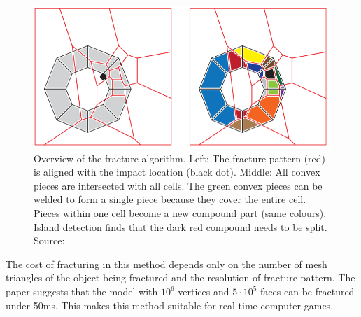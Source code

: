 \begin{figure}
\centering
        \includegraphics[width=\textwidth]{img/vacdAlgorithm}
        \caption{Overview of the fracture algorithm. Left: The fracture pattern (red) is aligned with the impact location (black dot). Middle: All
convex pieces are intersected with all cells. The green convex pieces can be welded to form a single piece because they cover the entire
cell. Pieces within one cell become a new compound part (same colours). Island detection finds that the dark red compound needs to be split. Source: \citet{nvidia}}
        \label{fig:vacdalg}
\end{figure}

The cost of fracturing in this method depends only on the number of mesh triangles of the object being fractured and the resolution of fracture pattern. The paper suggests that the model with $10^6$ vertices and $5\cdot10^5$ faces can be fractured under 50ms. This makes this method suitable for real-time computer games.

